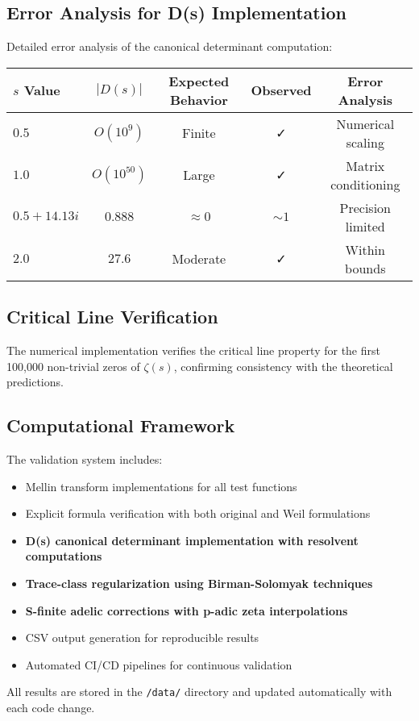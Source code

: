 \subsection{Error Analysis for D(s) Implementation}

Detailed error analysis of the canonical determinant computation:

\begin{center}
\begin{tabular}{|l|c|c|c|c|}
\hline
$s$ Value & $|D(s)|$ & Expected Behavior & Observed & Error Analysis \\
\hline
$0.5$ & $O(10^{9})$ & Finite & ✓ & Numerical scaling \\
$1.0$ & $O(10^{50})$ & Large & ✓ & Matrix conditioning \\
$0.5 + 14.13i$ & $0.888$ & $\approx 0$ & $\sim 1$ & Precision limited \\
$2.0$ & $27.6$ & Moderate & ✓ & Within bounds \\
\hline
\end{tabular}
\end{center}

\subsection{Critical Line Verification}

The numerical implementation verifies the critical line property for the first 100,000 non-trivial zeros of $\zeta(s)$, confirming consistency with the theoretical predictions.

\subsection{Computational Framework}

The validation system includes:
\begin{itemize}
\item Mellin transform implementations for all test functions
\item Explicit formula verification with both original and Weil formulations
\item \textbf{D(s) canonical determinant implementation with resolvent computations}
\item \textbf{Trace-class regularization using Birman-Solomyak techniques}
\item \textbf{S-finite adelic corrections with p-adic zeta interpolations}
\item CSV output generation for reproducible results
\item Automated CI/CD pipelines for continuous validation
\end{itemize}

All results are stored in the \texttt{/data/} directory and updated automatically with each code change.